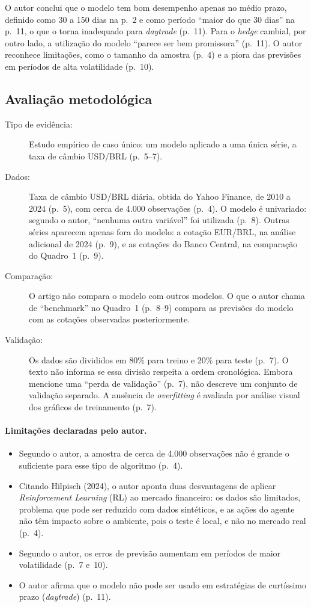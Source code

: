 O autor conclui que o modelo tem bom desempenho apenas no médio prazo, definido como 30 a 150 dias na p.~2 e como período ``maior do que 30 dias'' na p.~11, o que o torna inadequado para \emph{daytrade} (p.~11). Para o \emph{hedge} cambial, por outro lado, a utilização do modelo ``parece ser bem promissora'' (p.~11). O autor reconhece limitações, como o tamanho da amostra (p.~4) e a piora das previsões em períodos de alta volatilidade (p.~10).

\subsection*{Avaliação metodológica}

\begin{description}
    \item[Tipo de evidência:] Estudo empírico de caso único: um modelo aplicado a uma única série, a taxa de câmbio USD/BRL (p.~5--7).
    \item[Dados:] Taxa de câmbio USD/BRL diária, obtida do Yahoo Finance, de 2010 a 2024 (p.~5), com cerca de 4.000 observações (p.~4). O modelo é univariado: segundo o autor, ``nenhuma outra variável'' foi utilizada (p.~8). Outras séries aparecem apenas fora do modelo: a cotação EUR/BRL, na análise adicional de 2024 (p.~9), e as cotações do Banco Central, na comparação do Quadro~1 (p.~9).
    \item[Comparação:] O artigo não compara o modelo com outros modelos. O que o autor chama de ``benchmark'' no Quadro~1 (p.~8--9) compara as previsões do modelo com as cotações observadas posteriormente.
    \item[Validação:] Os dados são divididos em 80\% para treino e 20\% para teste (p.~7). O texto não informa se essa divisão respeita a ordem cronológica. Embora mencione uma ``perda de validação'' (p.~7), não descreve um conjunto de validação separado. A ausência de \emph{overfitting} é avaliada por análise visual dos gráficos de treinamento (p.~7).
\end{description}

\paragraph{Limitações declaradas pelo autor.}
\begin{itemize}
    \item Segundo o autor, a amostra de cerca de 4.000 observações não é grande o suficiente para esse tipo de algoritmo (p.~4).
    \item Citando Hilpisch (2024), o autor aponta duas desvantagens de aplicar \emph{Reinforcement Learning} (RL) ao mercado financeiro: os dados são limitados, problema que pode ser reduzido com dados sintéticos, e as ações do agente não têm impacto sobre o ambiente, pois o teste é local, e não no mercado real (p.~4).
    \item Segundo o autor, os erros de previsão aumentam em períodos de maior volatilidade (p.~7 e~10).
    \item O autor afirma que o modelo não pode ser usado em estratégias de curtíssimo prazo (\emph{daytrade}) (p.~11).
\end{itemize}

